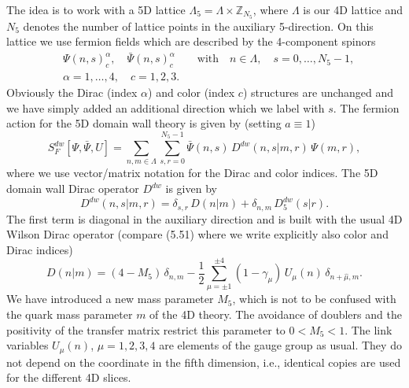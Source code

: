 The idea is to work with a 5D lattice $\Lambda_5 = \Lambda \times
\mathbb{Z}_{N_5}$, where $\Lambda$ is our 4D lattice and $N_5$ denotes the
number of lattice points in the auxiliary 5-direction. On this lattice we use
fermion fields which are described by the 4-component spinors
\begin{equation}
  \begin{aligned}
    &\Psi(n, s)^{\alpha}_c , \quad \bar\Psi(n, s)^{\alpha}_c
    \qquad \text{with} \quad n \in \Lambda , \quad
    s = 0, \ldots, N_5 - 1 , \\
    &\alpha = 1, \ldots, 4 , \quad c = 1, 2, 3 .
  \end{aligned}
\end{equation}
Obviously the Dirac (index $\alpha$) and color (index $c$) structures are
unchanged and we have simply added an additional direction which we label with
$s$. The fermion action for the 5D domain wall theory is given by (setting
$a \equiv 1$)
\begin{equation}
  S_F^{dw}[\Psi, \bar\Psi, U] =
  \sum_{n,m\in\Lambda}\sum_{s,r=0}^{N_5-1}
  \bar\Psi(n, s)\, D^{dw}(n, s|m, r)\, \Psi(m, r) ,
\end{equation}
where we use vector/matrix notation for the Dirac and color indices. The 5D
domain wall Dirac operator $D^{dw}$ is given by
\begin{equation}
  D^{dw}(n, s|m, r) = \delta_{s,r}\, D(n|m) + \delta_{n,m}\, D_5^{dw}(s|r) .
\end{equation}
The first term is diagonal in the auxiliary direction and is built with the
usual 4D Wilson Dirac operator (compare (5.51) where we write explicitly also
color and Dirac indices)
\begin{equation}
  D(n|m) = (4 - M_5)\,\delta_{n,m} -
  \frac{1}{2}\sum_{\mu=\pm1}^{\pm4}
  (1 - \gamma_\mu)\, U_\mu(n)\, \delta_{n+\hat\mu,m} .
\end{equation}
We have introduced a new mass parameter $M_5$, which is not to be confused
with the quark mass parameter $m$ of the 4D theory. The avoidance of doublers
and the positivity of the transfer matrix restrict this parameter to
$0 < M_5 < 1$. The link variables $U_\mu(n)$, $\mu = 1, 2, 3, 4$ are elements
of the gauge group as usual. They do not depend on the coordinate in the fifth
dimension, i.e., identical copies are used for the different 4D slices.

